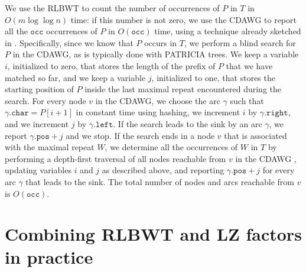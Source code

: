 \documentclass[a4paper,UKenglish]{lipics-v2016}
\begin{document}
We use the RLBWT to count the number of occurrences of $P$ in $T$ in $O(m\log{\log{n}})$ time: if this number is not zero, we use the CDAWG to report all the $\mathtt{occ}$ occurrences of $P$ in $O(\mathtt{occ})$ time, using a technique already sketched in \cite{crochemore1997automata}. Specifically, since we know that $P$ occurs in $T$, we perform a blind search for $P$ in the CDAWG, as is typically done with PATRICIA trees. We keep a variable $i$, initialized to zero, that stores the length of the prefix of $P$ that we have matched so far, and we keep a variable $j$, initialized to one, that stores the starting position of $P$ inside the last maximal repeat encountered during the search. For every node $v$ in the CDAWG, we choose the arc $\gamma$ such that $\gamma.\mathtt{char}=P[i+1]$ in constant time using hashing, we increment $i$ by $\gamma.\mathtt{right}$, and we increment $j$ by $\gamma.\mathtt{left}$. If the search leads to the sink by an arc $\gamma$, we report $\gamma.\mathtt{pos}+j$ and we stop. If the search ends in a node $v$ that is associated with the maximal repeat $W$, we determine all the occurrences of $W$ in $T$ by performing a depth-first traversal of all nodes reachable from $v$ in the CDAWG , updating variables $i$ and $j$ as described above, and reporting $\gamma.\mathtt{pos}+j$ for every arc $\gamma$ that leads to the sink. The total number of nodes and arcs reachable from $v$ is $O(\mathtt{occ})$.












































\section{Combining RLBWT and LZ factors in practice}
\end{document}
